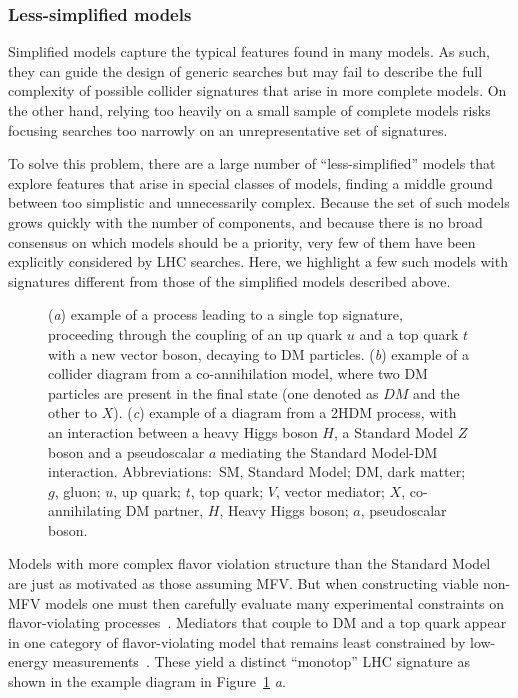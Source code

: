 \documentclass{ar-1col}
\begin{document}
\subsubsection{Less-simplified models}\label{sec:LessSimplifiedModels}

Simplified models capture the typical features found in many models. 
As such, they can guide the design of generic searches but may fail to describe
the full complexity of possible collider signatures that
arise in more complete models. On the other hand, 
relying too heavily on a small sample of complete models risks focusing
searches too narrowly on an unrepresentative set of signatures.

To solve this problem, 
there are a large number of ``less-simplified'' models that
explore features that arise in special classes of models, 
finding a middle ground between too
simplistic and unnecessarily complex. Because the
set of such models grows quickly with the number of components,
and because there is no broad consensus on which models should be a
priority, very few of them have been explicitly considered by LHC
searches. Here, we highlight a few such models with signatures different from those of
 the simplified models described above.

\begin{figure}[!htpb]
\caption{
(\textit{a}) example of a process leading to a single top signature, proceeding through the coupling of an up quark $u$ and a top quark $t$ with a new vector boson, decaying to DM particles. 
(\textit{b}) example of a collider diagram from a co-annihilation model, where two DM particles are present in the final state (one denoted as $DM$ and the other to $X$). 
(\textit{c}) example of a diagram from a 2HDM process, with an interaction between a heavy Higgs boson $H$, a Standard Model $Z$ boson and a  pseudoscalar $a$ mediating the Standard Model-DM interaction. 
Abbreviations:\ SM, Standard Model; DM, dark matter; $g$, gluon; $u$, up quark; $t$, top quark; $V$, vector mediator; $X$, co-annihilating DM partner, $H$, Heavy Higgs boson; $a$, pseudoscalar boson.}
\label{fig:feynman_2}
\end{figure}

Models with more complex flavor violation structure than the Standard Model 
are just as motivated as those assuming MFV. 
But when constructing viable non-MFV models one must then carefully evaluate 
many experimental constraints on flavor-violating processes~\cite{Blanke:2017tnb}. 
Mediators that couple to
DM and a top quark appear in one category of flavor-violating
model that remains least constrained by low-energy
measurements~\cite{Boucheneb:2014wza}. These yield a distinct
``monotop'' LHC signature as shown in the example diagram in Figure~\ref{fig:feynman_2} \textit{a}.
\end{document}

